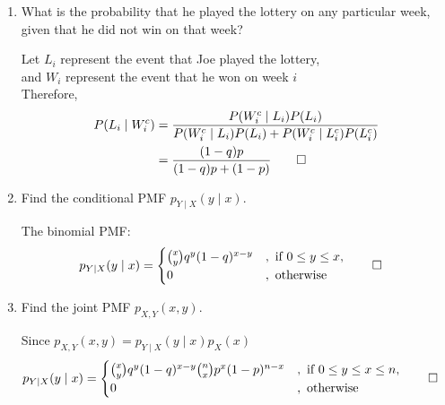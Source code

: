 \documentclass[paper=usletter, fontsize=12pt]{article}
\begin{document}
\begin{enumerate}
\begin{enumerate}
            \item What is the probability that he played the lottery on any
            particular week, given that he did not win on that week?
            \begin{cproof}

                Let $L_i$ represent the event that Joe played the lottery, \\
                and $W_i$ represent the event that he won on week $i$ \\
                Therefore,
                \begin{align*}
                    P(L_i \mid W_i^c) &= \frac{P(W_i^c \mid L_i)P(L_i)}{P(W_i^c \mid L_i)P(L_i) + P(W_i^c \mid L_i^c)P(L_i^c)}\\
                    & = \frac{(1-q)p}{(1-q)p+(1-p)} \qedhere
                \end{align*}
                \endgroup

            \end{cproof}

            \item Find the conditional PMF $p_{Y \mid X}(y \mid x)$.
            \begin{cproof}

                The binomial PMF:
                \begin{align*}
                    p_{Y \mid X}(y \mid x) & =
                    \begin{cases}
                        \binom{x}{y}q^y(1-q)^{x-y} &, \text{ if } 0 \le y \le x,\\
                        0 &, \text{ otherwise }
                    \end{cases} \qedhere
                \end{align*}
                \endgroup

            \end{cproof}

            \item Find the joint PMF $p_{X, Y}(x, y)$.
            \begin{cproof}

                Since $p_{X, Y}(x, y) = p_{Y \mid X}(y \mid x)p_X(x)$
                \begin{align*}
                    p_{Y \mid X}(y \mid x) & =
                    \begin{cases}
                        \binom{x}{y}q^y(1-q)^{x-y}\binom{n}{x}p^x(1-p)^{n-x} &, \text{ if } 0 \le y \le x \le n,\\
                        0 &, \text{ otherwise }
                    \end{cases} \qedhere
                \end{align*}
                \endgroup


\end{cproof}
\end{enumerate}
\end{enumerate}
\end{document}
